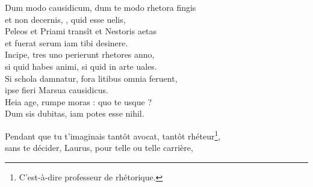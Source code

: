 \documentclass[12pt]{book} %
\begin{document}
\begin{alignment}
  \begin{edition}
    \begin{ekdverse}[type={distiques_élégiaques}]
        \begin{patverse*}
          Dum modo causidicum, dum te modo rhetora fingis \\ 
          et non decernis, , quid esse uelis, \\ 
          Peleos et Priami transît et Nestoris aetas \\ 
          et fuerat serum iam tibi desinere. \\ 
          Incipe, tres uno perierunt rhetores anno, \\
          si quid habes animi, si quid in arte uales. \\ 
          Si schola damnatur, fora litibus omnia feruent, \\ 
          ipse  fieri Marsua causidicus. \\ 
          Heia age, rumpe moras : quo te 
          usque ? \\ 
          Dum  sis dubitas, iam potes esse nihil.   \\
        \end{patverse*}
    \end{ekdverse}
  \end{edition}
  \begin{translation}
    \begin{ekdverse}[type={distiques_élégiaques}]
        \begin{patverse*}
        Pendant que tu t'imaginais tantôt avocat, tantôt rhéteur\footnote{C'est-à-dire professeur de rhétorique.}, \\
        sans te décider, Laurus, pour telle ou telle carrière, \\ 

\end{patverse*}
\end{ekdverse}
\end{translation}
\end{alignment}
\end{document}
